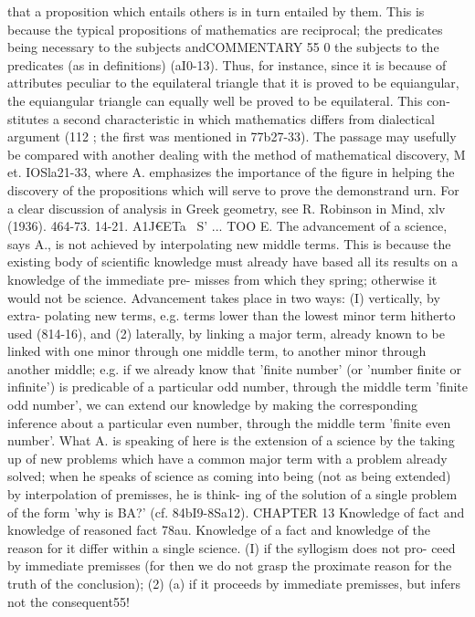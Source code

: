 {{{{{{{{{{{{{that a proposition which entails others is in turn entailed by
them. This is because the typical propositions of mathematics
are reciprocal; the predicates being necessary to the subjects andCOMMENTARY
55 0
the subjects to the predicates (as in definitions) (aI0-13). Thus, for
instance, since it is because of attributes peculiar to the equilateral
triangle that it is proved to be equiangular, the equiangular
triangle can equally well be proved to be equilateral. This con-
stitutes a second characteristic in which mathematics differs from
dialectical argument (112 ; the first was mentioned in 77b27-33).
The passage may usefully be compared with another dealing
with the method of mathematical discovery, M et. IOSla21-33,
where A. emphasizes the importance of the figure in helping the
discovery of the propositions which will serve to prove the
demonstrand urn.
For a clear discussion of analysis in Greek geometry, see
R. Robinson in Mind, xlv (1936). 464-73.
14-21. A1J€ETa~ S' ... TOO E. The advancement of a science,
says A., is not achieved by interpolating new middle terms. This
is because the existing body of scientific knowledge must already
have based all its results on a knowledge of the immediate pre-
misses from which they spring; otherwise it would not be science.
Advancement takes place in two ways: (I) vertically, by extra-
polating new terms, e.g. terms lower than the lowest minor term
hitherto used (814-16), and (2) laterally, by linking a major term,
already known to be linked with one minor through one middle
term, to another minor through another middle; e.g. if we
already know that 'finite number' (or 'number finite or infinite')
is predicable of a particular odd number, through the middle
term 'finite odd number', we can extend our knowledge by making
the corresponding inference about a particular even number,
through the middle term 'finite even number'. What A. is
speaking of here is the extension of a science by the taking up of
new problems which have a common major term with a problem
already solved; when he speaks of science as coming into being
(not as being extended) by interpolation of premisses, he is think-
ing of the solution of a single problem of the form 'why is BA?'
(cf. 84bI9-8Sa12).
CHAPTER 13
Knowledge of fact and knowledge of reasoned fact
78au. Knowledge of a fact and knowledge of the reason for
it differ within a single science. (I) if the syllogism does not pro-
ceed by immediate premisses (for then we do not grasp the
proximate reason for the truth of the conclusion); (2) (a) if it
proceeds by immediate premisses, but infers not the consequent55!
}}}}}}}}}}}}}
